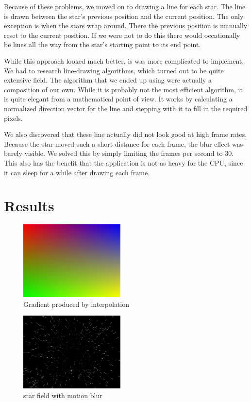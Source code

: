 \documentclass[a4paper]{article}
\begin{document}
Because of these problems, we moved on to drawing a line for each star.
The line is drawn between the star's previous position and the current position.
The only exception is when the stars wrap around.
There the previous position is manually reset to the current position.
If we were not to do this there would occationally be lines all the way from the star's starting point to its end point.

While this approach looked much better, is was more complicated to implement.
We had to research line-drawing algorithms, which turned out to be quite extensive field.
The algorithm that we ended up using were actually a composition of our own.
While it is probably not the most efficient algorithm, it is quite elegant from a mathematical point of view.
It works by calculating a normalized direction vector for the line and stepping with it to fill in the required pixels.

We also discovered that these line actually did not look good at high frame rates.
Because the star moved such a short distance for each frame, the blur effect was barely visible.
We solved this by simply limiting the frames per second to 30.
This also has the benefit that the application is not as heavy for the CPU, since it can sleep for a while after drawing each frame.

\section{Results}

\begin{figure}
\includegraphics[width=150pt]{gradient.png}
\caption{Gradient produced by interpolation}
\end{figure}

\begin{figure}
\includegraphics[width=150pt]{starfield.png}
\caption{star field with motion blur}
\end{figure}
\end{document}

